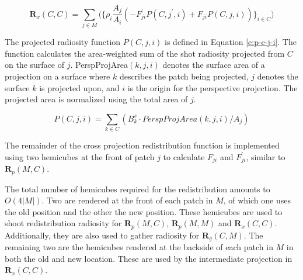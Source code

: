\begin{equation}\label{e:cross-redistribution-radiosity}
	\mathbf{R}_x(C,C)=\sum_{j\in M}\bigg(\bigg\{\rho_i\frac{A_j}{A_i}(-F^{'}_{ji}P(C,j^{'},i)+F_{ji}P(C,j,i))\bigg\}_{i\in C}\bigg)	
\end{equation}

The projected radiosity function $P(C,j,i)$ is defined in Equation \ref{e:p-c-j-i}. The function calculates the area-weighted sum of the shot radiosity projected from $C$ on the surface of $j$. PerspProjArea$(k, j, i)$ denotes the surface area of a projection on a surface where $k$ describes the patch being projected, $j$ denotes the surface $k$ is projected upon, and $i$ is the origin for the perspective projection. The projected area is normalized using the total area of $j$.

\begin{equation}\label{e:p-c-j-i}
	P(C,j,i)=\sum_{k\in C}(B^{s}_k\cdot PerspProjArea(k,j,i)/A_j)
\end{equation}

The remainder of the cross projection redistribution function is implemented using two hemicubes at the front of patch $j$ to calculate $F_{ji}$ and $F^{'}_{ji}$, similar to $\mathbf{R}_p(M,C)$.

The total number of hemicubes required for the redistribution amounts to $O(4|M|)$. Two are rendered at the front of each patch in $M$, of which one uses the old position and the other the new position. These hemicubes are used to shoot redistribution radiosity for $\mathbf{R}_p(M,C)$, $\mathbf{R}_p(M,M)$ and $\mathbf{R}_x(C,C)$. Additionally, they are also used to gather radiosity for $\mathbf{R}_g(C,M)$. The remaining two are the hemicubes rendered at the backside of each patch in $M$ in both the old and new location. These are used by the intermediate projection in $\mathbf{R}_x(C,C)$.